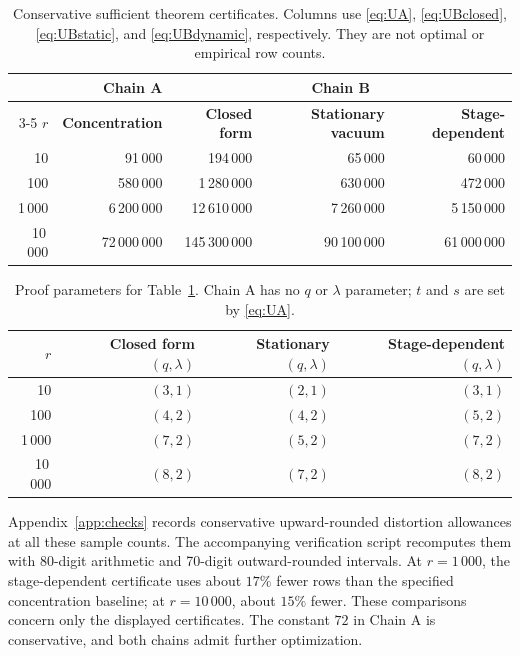 \documentclass[11pt]{article}
\numberwithin{equation}{section}
\theoremstyle{definition}\newtheorem{definition}[theorem]{Definition}
\theoremstyle{remark}\newtheorem{remark}[theorem]{Remark}
\begin{document}
\begin{table}[htbp]\centering
\small\setlength{\tabcolsep}{5pt}\renewcommand{\arraystretch}{1.25}
\begin{tabular}{@{}rrrrr@{}}
\toprule
&\textbf{Chain A}&\multicolumn{3}{c}{\textbf{Chain B}}\\
\cmidrule(l){3-5}
\textbf{$r$}&\textbf{Concentration}&\textbf{Closed form}&\textbf{Stationary vacuum}&\textbf{Stage-dependent}\\
\midrule
10&91\,000&194\,000&65\,000&60\,000\\
100&580\,000&1\,280\,000&630\,000&472\,000\\
1\,000&6\,200\,000&12\,610\,000&7\,260\,000&5\,150\,000\\
10\,000&72\,000\,000&145\,300\,000&90\,100\,000&61\,000\,000\\
\bottomrule
\end{tabular}
\caption{Conservative sufficient theorem certificates. Columns use
\eqref{eq:UA}, \eqref{eq:UBclosed}, \eqref{eq:UBstatic}, and \eqref{eq:UBdynamic},
respectively. They are not optimal or empirical row counts.}\label{tab:counts}
\end{table}

\begin{table}[htbp]\centering
\small\setlength{\tabcolsep}{12pt}\renewcommand{\arraystretch}{1.2}
\begin{tabular}{@{}rrrr@{}}
\toprule
\textbf{$r$}&\textbf{Closed form $(q,\lambda)$}&\textbf{Stationary $(q,\lambda)$}&\textbf{Stage-dependent $(q,\lambda)$}\\
\midrule
10&$(3,1)$&$(2,1)$&$(3,1)$\\
100&$(4,2)$&$(4,2)$&$(5,2)$\\
1\,000&$(7,2)$&$(5,2)$&$(7,2)$\\
10\,000&$(8,2)$&$(7,2)$&$(8,2)$\\
\bottomrule
\end{tabular}
\caption{Proof parameters for Table~\ref{tab:counts}. Chain A has no $q$ or
$\lambda$ parameter; $t$ and $s$ are set by \eqref{eq:UA}.}\label{tab:parameters}
\end{table}

Appendix~\ref{app:checks} records conservative upward-rounded distortion
allowances at all these sample counts. The accompanying verification script
recomputes them with 80-digit arithmetic and 70-digit outward-rounded intervals.
At $r=1\,000$, the stage-dependent certificate uses about $17\%$ fewer rows than
the specified concentration baseline; at $r=10\,000$, about $15\%$ fewer.
These comparisons concern only the displayed certificates. The constant $72$
in Chain A is conservative, and both chains admit further optimization.
\end{document}
